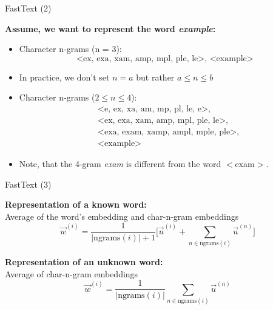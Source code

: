 \documentclass[11pt,compress,t,notes=noshow, xcolor=table]{beamer}
\begin{document}

\begin{vbframe}{FastText (2)}

\vfill

\textbf{Assume, we want to represent the word \textit{example}:}

\begin{itemize}
	\item Character n-grams (n = 3):  
		$$\text{<ex, exa, xam, amp, mpl, ple, le>, <example>}$$
	\item In practice, we don't set $n = a$ but rather $a \leq n \leq b$
	\item Character n-grams ($2 \leq n \leq 4$):
  \begin{align*}
    & \text{<e, ex, xa, am, mp, pl, le, e>,} \\
    & \text{<ex, exa, xam, amp, mpl, ple, le>,} \\
    & \text{<exa, exam, xamp, ampl, mple, ple>,} \\
		& \text{<example>}
  \end{align*}
	\item Note, that the 4-gram \textit{exam} is different from the word $<$exam$>$.
\end{itemize}

\vfill

\end{vbframe}


\begin{vbframe}{FastText (3)}

\vfill

\textbf{Representation of a known word:}\\ Average of the word's embedding and char-n-gram embeddings
$$\vec w^{(i)} = \frac{1}{|\mathrm{ngrams}(i)| + 1} \Big[ \vec u^{(i)} + \sum_{n \in \mathrm{ngrams}(i)} \vec u^{(n)} \Big]$$

\textbf{Representation of an unknown word:}\\ Average of char-n-gram embeddings
$$\vec w^{(i)} = \frac{1}{|\mathrm{ngrams}(i)|} \sum_{n \in \mathrm{ngrams}(i)} \vec u^{(n)}$$


\vfill

\end{vbframe}
\end{document}
